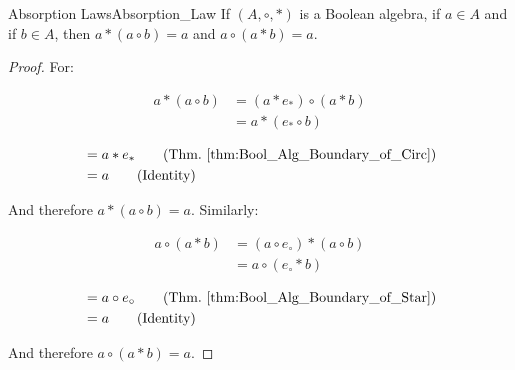     \begin{ltheorem}{Absorption Laws}{Absorption_Law}
        If $(A,\circ,*)$ is a Boolean algebra, if $a\in{A}$ and if $b\in{A}$,
        then $a*(a\circ{b})=a$ and $a\circ(a*{b})=a$.
    \end{ltheorem}
    \begin{proof}
        For:
        \par
        \begin{minipage}[t]{0.59\textwidth}
            \centering
            \begin{align}
                a*(a\circ{b})&=(a*e_{*})\circ(a*b)
                \tag{Identity}\\
                &=a*(e_{*}\circ{b})
                \tag{Distributivity}
            \end{align}
        \end{minipage}
        \hfill
        \begin{minipage}[t]{0.39\textwidth}
            \centering
            \begin{align}
                &=a*e_{*}
                \tag{Thm.~\ref{thm:Bool_Alg_Boundary_of_Circ}}\\
                &=a
                \tag{Identity}
            \end{align}
        \end{minipage}
        \par\vspace{2.5ex}
        And therefore $a*(a\circ{b})=a$. Similarly:
        \par
        \begin{minipage}[t]{0.59\textwidth}
            \centering
            \begin{align}
                a\circ(a*b)&=(a\circ{e}_{\circ})*(a\circ{b})
                \tag{Identity}\\
                &=a\circ(e_{\circ}*b)
                \tag{Distributivity}
            \end{align}
        \end{minipage}
        \hfill
        \begin{minipage}[t]{0.39\textwidth}
            \begin{align}
                &=a\circ{e}_{\circ}
                \tag{Thm.~\ref{thm:Bool_Alg_Boundary_of_Star}}\\
                &=a
                \tag{Identity}
            \end{align}
        \end{minipage}
        \par\vspace{2.5ex}
        And therefore $a\circ(a*b)=a$.
    \end{proof}
